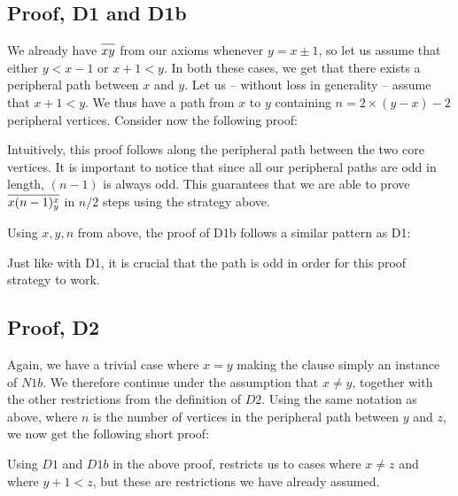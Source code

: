 \subsection{Proof, D1 and D1b}
\label{sub:Proof, D1 and D1b}
We already have $\ol{xy}$ from our axioms whenever $y = x \pm 1$, so let us assume that either $y < x-1$ or $x + 1 < y$.
In both these cases, we get that there exists a peripheral path between $x$ and $y$.
Let us -- without loss in generality -- assume that $x + 1 < y$.
We thus have a path from $x$ to $y$ containing $n = 2 \times (y - x) - 2$ peripheral vertices.
Consider now the following proof:
\begin{prooftree*}
\end{prooftree*}
Intuitively, this proof follows along the peripheral path between the two core vertices.
It is important to notice that since all our peripheral paths are odd in length, $(n-1)$ is always odd.
This guarantees that we are able to prove $\ol{x(n-1)^x_y}$ in $n/2$ steps using the strategy above.

Using $x,y,n$ from above, the proof of D1b follows a similar pattern as D1:
\begin{prooftree*}
\end{prooftree*}
Just like with D1, it is crucial that the path is odd in order for this proof strategy to work.
\subsection{Proof, D2}
\label{sub:Proof, D2}
Again, we have a trivial case where $x = y$ making the clause simply an instance of $N1b$.
We therefore continue under the assumption that $x \neq y$, together with the other restrictions from the definition of $D2$.
Using the same notation as above, where $n$ is the number of vertices in the peripheral path between $y$ and $z$, we now get the following short proof:
\begin{prooftree*}
\end{prooftree*}
Using $D1$ and $D1b$ in the above proof, restricts us to cases where $x \neq z$ and where $y+1 < z$, but these are restrictions we have already assumed.
